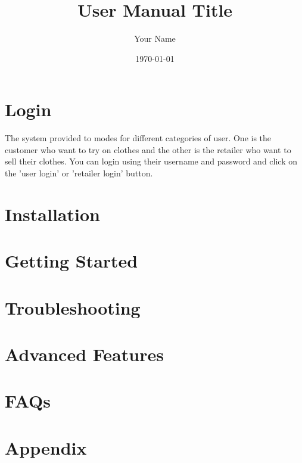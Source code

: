 \documentclass{article}
\title{User Manual Title}
\author{Your Name}
\date{\today}
\begin{document}
\maketitle

\tableofcontents
\newpage

\section{Login}
The system provided to modes for different categories of user. One is the customer who want to try
on clothes and the other is the retailer who want to sell their clothes.
You can login using their username and password and click on the 'user login' or 'retailer login' button.

\section{Installation}

\section{Getting Started}

\section{Troubleshooting}

\section{Advanced Features}

\section{FAQs}

\section{Appendix}
\end{document}
